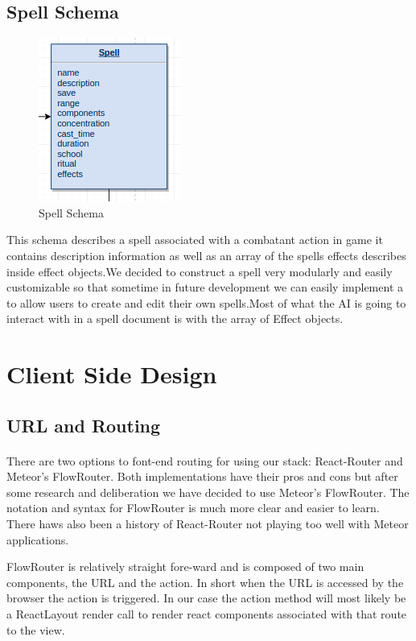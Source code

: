 \documentclass[12pt,a4paper]{report}
\begin{document}
		\subsection {Spell Schema}
			\begin{figure}[H]
				\centering
				\includegraphics[scale=.9]{schema-spell}
				\caption{Spell Schema}
				\label{fig: Spell Schema }
			\end{figure}
		This schema describes a spell associated with a combatant action in game it contains description information as well as an array of the spells effects describes inside effect objects.We decided to construct a spell very modularly and easily customizable so that sometime in future development we can easily implement a to allow users to create and edit their own spells.Most of what the AI is going to interact with in a spell document is with the array of Effect objects.

\newpage
\section{Client Side Design}
	\subsection{URL and Routing}
		\paragraph {} There are two options to font-end routing for using our stack: React-Router and Meteor's FlowRouter. Both implementations have their pros and cons but after some research and deliberation we have decided to use Meteor's FlowRouter. The notation and syntax for FlowRouter is much more clear and easier to learn. There haws also been a history of React-Router not playing too well with Meteor applications. 
		
		FlowRouter is relatively straight fore-ward and is composed of two main components, the URL and the action. In short when the URL is accessed by the browser the action is triggered. In our case the action method will most likely be a ReactLayout render call to render react components associated with that route to the view. 
		
\end{document}
